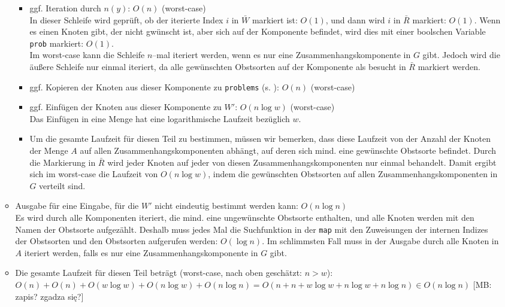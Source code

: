 \documentclass[a4paper,10pt,ngerman]{scrartcl}
\newcommand{\mb}[1]{{\color{red}[MB: #1]}}
\newcommand{\ttt}[1]{\texttt{#1}}
\begin{document}
\begin{itemize}
\begin{itemize}
\begin{itemize}
    \item ggf. Iteration durch $n(y)$: $O(n)$ (worst-case)\\
    In dieser Schleife wird geprüft, ob der iterierte Index $i$ in $\bar{W}$ markiert ist: $O(1)$,
    und dann wird $i$ in $\bar{R}$ markiert: $O(1)$. Wenn es einen Knoten gibt, der nicht gwünscht ist,
    aber sich auf der Komponente befindet, wird dies mit einer boolschen Variable \ttt{prob} markiert: $O(1)$.\\
    Im worst-case kann die Schleife $n$--mal iteriert werden, wenn es nur eine Zusammenhangskomponente
    in $G$ gibt. Jedoch wird die äußere Schleife nur einmal iteriert, da alle gewünschten 
    Obstsorten auf der Komponente als besucht in $\bar{R}$ markiert werden.
    \item ggf. Kopieren der Knoten aus dieser Komponente zu \ttt{problems} (s. ): $O(n)$ (worst-case)

    \item ggf. Einfügen der Knoten aus dieser Komponente zu $W'$: $O(n \log w)$ (worst-case)\\
    Das Einfügen in eine Menge hat eine logarithmische Laufzeit bezüglich $w$.

    \item Um die gesamte Laufzeit für diesen Teil zu bestimmen, müssen wir bemerken, dass 
    diese Laufzeit von der Anzahl der Knoten der Menge $A$ auf allen Zusammenhangskomponenten 
    abhängt, auf deren sich mind. eine gewünschte Obstsorte befindet. Durch die Markierung
    in $\bar{R}$ wird jeder Knoten auf jeder von diesen Zusammenhangskomponenten nur einmal behandelt. 
    Damit ergibt sich im worst-case die Laufzeit von $O(n \log w)$, indem die gewünschten Obstsorten auf 
    allen Zusammenhangskomponenten in $G$ verteilt sind.
    \end{itemize}

    \item Ausgabe für eine Eingabe, für die $W'$ nicht eindeutig bestimmt werden kann: $O(n \log n)$\\
    Es wird durch alle Komponenten iteriert, die mind. eine ungewünschte Obstsorte enthalten,
    und alle Knoten werden mit den Namen der Obstsorte aufgezählt.
    Deshalb muss jedes Mal die Suchfunktion in der \ttt{map} mit den Zuweisungen 
    der internen Indizes der Obstsorten und den Obstsorten aufgerufen werden: $O(\log n)$.
    Im schlimmsten Fall muss in der Ausgabe durch alle Knoten in $A$ iteriert werden, falls
    es nur eine Zusammenhangskomponente in $G$ gibt.

    \item Die gesamte Laufzeit für diesen Teil beträgt (worst-case, nach oben geschätzt: $n > w$):
    $O(n) + O(n) + O(w \log w) + O(n \log w) + O(n \log n) = O(n + n + w \log w + n \log w + n \log n)
    \in O(n \log n)$ \mb{zapis? zgadza się?}
  \end{itemize}

\end{itemize}
\end{document}
